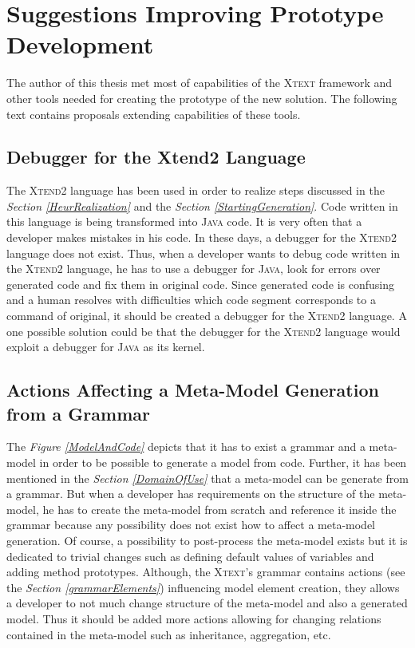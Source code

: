 \documentclass[12pt,notitlepage,a4paper]{report}
\begin{document}
\section{Suggestions Improving Prototype Development}

The author of this thesis met most of capabilities of the \textsc{Xtext} framework and other tools needed for creating the prototype of the new solution. The following text contains proposals extending capabilities of these tools.

\subsection{Debugger for the Xtend2 Language}

The \textsc{Xtend2} language has been used in order to realize steps discussed in the \textit{Section \ref{HeurRealization}} and the \textit{Section \ref{StartingGeneration}}. Code written in this language is being transformed into \textsc{Java} code. It is very often that a developer makes mistakes in his code. In these days, a debugger for the \textsc{Xtend2} language does not exist. Thus, when a developer wants to debug code written in the \textsc{Xtend2} language, he has to use a debugger for \textsc{Java}, look for errors over generated code and fix them in original code. Since generated code is confusing and a human resolves with difficulties which code segment corresponds to a command of original, it should be created a debugger for the \textsc{Xtend2} language. A one possible solution could be that the debugger for the \textsc{Xtend2} language would exploit a debugger for \textsc{Java} as its kernel.

\subsection{Actions Affecting a Meta-Model Generation from a Grammar}

The \textit{Figure \ref{ModelAndCode}} depicts that it has to exist a grammar and a meta-model in order to be possible to generate a model from code. Further, it has been mentioned in the \textit{Section \ref{DomainOfUse}} that a meta-model can be generate from a grammar. But when a developer has requirements on the structure of the meta-model, he has to create the meta-model from scratch and reference it inside the grammar because any possibility does not exist how to affect a meta-model generation.  Of course, a possibility to post-process the meta-model \cite{Postprocess} exists but it is dedicated to trivial changes such as defining default values of variables and adding method prototypes. Although, the \textsc{Xtext}'s grammar contains actions (see the \textit{Section \ref{grammarElements}}) influencing model element creation, they allows a developer to  not much change structure of the meta-model and also a generated model. Thus it should be added more actions allowing for changing relations contained in the meta-model such as inheritance, aggregation, etc.
\end{document}
